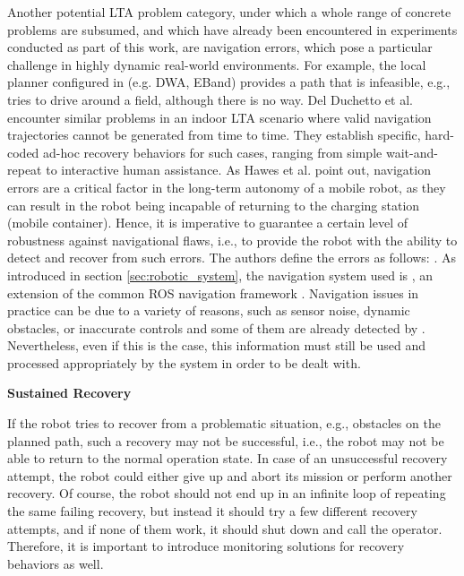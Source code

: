 \documentclass[english, master, utf8]{base/thesis_KBS}
\newcommand{\code}{\collectverb{\codebox}}
\begin{document}
\noindent
Another potential LTA problem category, under which a whole range of concrete problems are subsumed, and which have already been encountered in experiments conducted as part of
this work, are navigation errors, which pose a particular challenge in highly dynamic real-world environments. \cite{DelDuchetto:2018}
For example, the local planner configured in \code{move_base_flex} (e.g. DWA, EBand) provides a path that
is infeasible, e.g., tries to drive around a field,  although there is no way. Del Duchetto et al. encounter similar problems in an indoor LTA scenario where valid navigation
trajectories cannot be generated from time to time.
They establish specific, hard-coded ad-hoc recovery behaviors for such cases, ranging from simple wait-and-repeat to interactive human assistance. \cite{DelDuchetto:2018} As Hawes
et al. \cite{Hawes:2017} point out, navigation errors are a critical factor in the long-term autonomy of a mobile robot, as they can result in the robot being incapable of returning
to the charging station (mobile container). Hence, it is imperative to guarantee a certain level of robustness against navigational flaws, i.e., to provide the robot with the
ability to detect and recover from such errors. \cite{DelDuchetto:2018}
The authors define the errors as follows: . \cite{DelDuchetto:2018}
As introduced in section \ref{sec:robotic_system}, the navigation system used is \code{move_base_flex}, an extension of the common ROS navigation framework \code{move_base}.
Navigation issues in practice can be due to a variety of reasons, such as sensor noise, dynamic obstacles, or inaccurate controls \cite{DelDuchetto:2018} and some of them are already
detected by \code{move_base_flex}. Nevertheless, even if this is the case, this information must still be used and processed appropriately by the system in order to be dealt with.\newline

\noindent
\textbf{Sustained Recovery}\newline

\noindent
If the robot tries to recover from a problematic situation, e.g., obstacles on the planned path, such a recovery may not be successful, i.e., the robot may not be able
to return to the normal operation state. In case of an unsuccessful recovery attempt, the robot could either give up and abort its mission or perform another recovery.
Of course, the robot should not end up in an infinite loop of repeating the same failing recovery, but instead it should try a few different recovery attempts,
and if none of them work, it should shut down and call the operator. Therefore, it is important to introduce monitoring solutions for recovery behaviors as well.\newline
\end{document}
